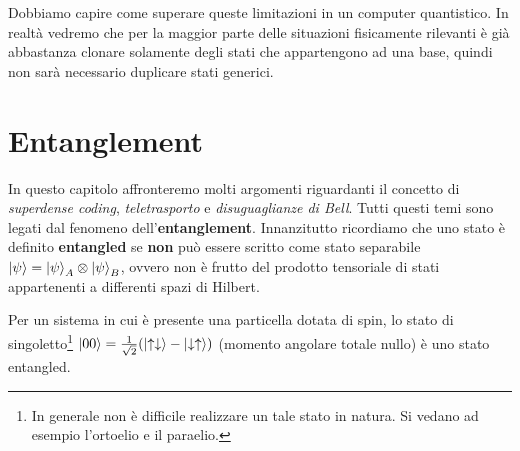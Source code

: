 \noindent Dobbiamo capire come superare queste limitazioni in un computer quantistico. In realtà vedremo che per la maggior parte delle situazioni fisicamente rilevanti è già abbastanza clonare solamente degli stati che appartengono ad una base, quindi non sarà necessario duplicare stati generici.  


\chapter{Entanglement}

In questo capitolo affronteremo molti argomenti riguardanti il concetto di \textit{superdense coding}, \textit{teletrasporto} e \textit{disuguaglianze di Bell}. Tutti questi temi sono legati dal fenomeno dell'\textbf{entanglement}. Innanzitutto ricordiamo che uno stato è definito \textbf{entangled} se \textbf{non} può essere scritto come stato separabile $\ket{\psi} = \ket{\psi}_A \otimes \ket{\psi}_B$, ovvero non è frutto del prodotto tensoriale di stati appartenenti a differenti spazi di Hilbert. 

\begin{esempio}
    Per un sistema in cui è presente una particella dotata di spin, lo stato di singoletto\footnote{In generale non è difficile realizzare un tale stato in natura. Si vedano ad esempio l'ortoelio e il paraelio.} $\ket{00} = \frac{1}{\sqrt{2}} (\ket{\uparrow \downarrow} - \ket{\downarrow \uparrow})$ (momento angolare totale nullo) è uno stato entangled. 
\end{esempio}

